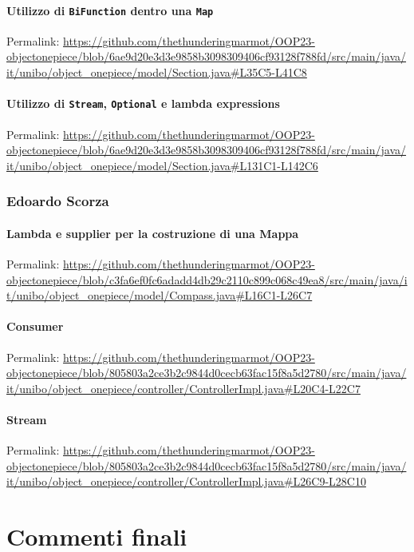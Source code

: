 \documentclass[a4paper,12pt]{report}
\begin{document}
\subsubsection{Utilizzo di \texttt{BiFunction} dentro una \texttt{Map}}

Permalink: \url{https://github.com/thethunderingmarmot/OOP23-objectonepiece/blob/6ae9d20e3d3e9858b3098309406cf93128f788fd/src/main/java/it/unibo/object_onepiece/model/Section.java#L35C5-L41C8}

\subsubsection{Utilizzo di \texttt{Stream}, \texttt{Optional} e lambda expressions}

Permalink: \url{https://github.com/thethunderingmarmot/OOP23-objectonepiece/blob/6ae9d20e3d3e9858b3098309406cf93128f788fd/src/main/java/it/unibo/object_onepiece/model/Section.java#L131C1-L142C6}

\subsection*{Edoardo Scorza}
\subsubsection{Lambda e supplier per la costruzione di una Mappa}
Permalink: \url{https://github.com/thethunderingmarmot/OOP23-objectonepiece/blob/c3fa6ef0fc6adadd4db29c2110c899c068c49ea8/src/main/java/it/unibo/object_onepiece/model/Compass.java#L16C1-L26C7}

\subsubsection{Consumer}
Permalink: \url{https://github.com/thethunderingmarmot/OOP23-objectonepiece/blob/805803a2ce3b2c9844d0cecb63fac15f8a5d2780/src/main/java/it/unibo/object_onepiece/controller/ControllerImpl.java#L20C4-L22C7}

\subsubsection{Stream}
Permalink: \url{https://github.com/thethunderingmarmot/OOP23-objectonepiece/blob/805803a2ce3b2c9844d0cecb63fac15f8a5d2780/src/main/java/it/unibo/object_onepiece/controller/ControllerImpl.java#L26C9-L28C10}	


\chapter{Commenti finali}
\end{document}
